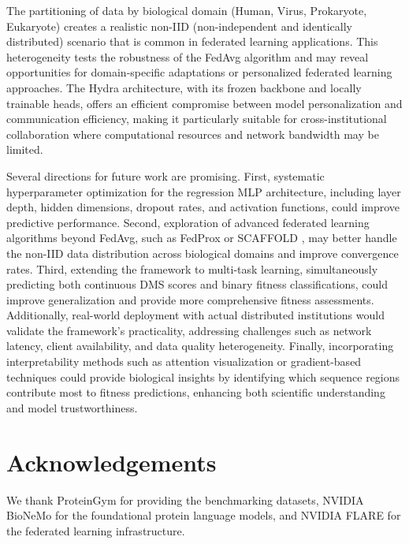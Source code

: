 \documentclass[11pt]{article}
\begin{document}
The partitioning of data by biological domain (Human, Virus, Prokaryote, Eukaryote) creates a realistic non-IID (non-independent and identically distributed) scenario that is common in federated learning applications. This heterogeneity tests the robustness of the FedAvg algorithm and may reveal opportunities for domain-specific adaptations or personalized federated learning approaches. The Hydra architecture, with its frozen backbone and locally trainable heads, offers an efficient compromise between model personalization and communication efficiency, making it particularly suitable for cross-institutional collaboration where computational resources and network bandwidth may be limited.

Several directions for future work are promising. First, systematic hyperparameter optimization for the regression MLP architecture, including layer depth, hidden dimensions, dropout rates, and activation functions, could improve predictive performance. Second, exploration of advanced federated learning algorithms beyond FedAvg, such as FedProx \cite{Li2020} or SCAFFOLD \cite{Karimireddy2020}, may better handle the non-IID data distribution across biological domains and improve convergence rates. Third, extending the framework to multi-task learning, simultaneously predicting both continuous DMS scores and binary fitness classifications, could improve generalization and provide more comprehensive fitness assessments. Additionally, real-world deployment with actual distributed institutions would validate the framework's practicality, addressing challenges such as network latency, client availability, and data quality heterogeneity. Finally, incorporating interpretability methods such as attention visualization or gradient-based techniques could provide biological insights by identifying which sequence regions contribute most to fitness predictions, enhancing both scientific understanding and model trustworthiness.

\section*{Acknowledgements}
We thank ProteinGym \cite{Notin2023} for providing the benchmarking datasets, NVIDIA BioNeMo for the foundational protein language models, and NVIDIA FLARE \cite{Roth2022} for the federated learning infrastructure. 




\end{document}
